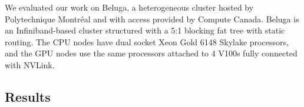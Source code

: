 We evaluated our work on Beluga, a heterogeneous cluster hosted by Polytechnique Montréal and with access provided by Compute Canada. 
Beluga is an Infiniband-based cluster structured with a 5:1 blocking fat tree with static routing.
The CPU nodes have dual socket Xeon Gold 6148 Skylake processors, and the GPU nodes use the same processors attached to 4 V100s fully connected with NVLink.

\subsection{Results}

% 
% 
% 

% 
% 
% 

% 
% 
% 

% 
% 
% 



% 
% 






